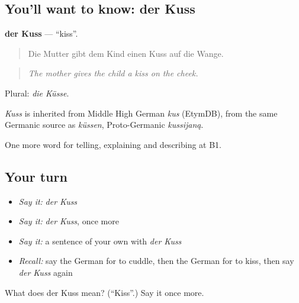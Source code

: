 \subsection*{You'll want to know: der Kuss}
\textbf{der Kuss} — \textquotedblleft{}kiss\textquotedblright{}.

\begin{quote}
Die Mutter gibt dem Kind einen Kuss auf die Wange.
\end{quote}

\begin{quote}
\emph{The mother gives the child a kiss on the cheek.}
\end{quote}

Plural: \emph{die Küsse}.

\begin{cousinweb}
\emph{Kuss} is inherited from Middle High German \emph{kus} (EtymDB), from the same Germanic source as \emph{küssen}, Proto-Germanic \emph{kussijaną}.
\end{cousinweb}

\begin{grammarlens}[title={What you've built}]
One more word for telling, explaining and describing at B1.
\end{grammarlens}

\subsection*{Your turn}
\begin{itemize}
\raggedright
  \item \emph{Say it:} \emph{der Kuss}
  \item \emph{Say it:} \emph{der Kuss}, once more
  \item \emph{Say it:} a sentence of your own with \emph{der Kuss}
  \item \emph{Recall:} say the German for to cuddle, then the German for to kiss, then say \emph{der Kuss} again
\end{itemize}

\begin{tcolorbox}[breakable,colback=teal!4,colframe=teal!35!black,title={Before you move on}]
What does der Kuss mean? (\textquotedblleft{}Kiss\textquotedblright{}.) Say it once more.
\end{tcolorbox}

